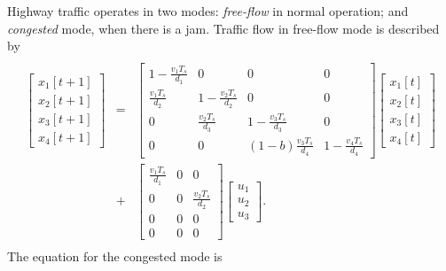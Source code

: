 \documentclass[letterpaper,10pt,english]{sphinxmanual}
\begin{document}
Highway traffic operates in two modes: \emph{free-flow} in normal operation;
and \emph{congested} mode, when there is a jam. Traffic flow in free-flow
mode is described by
\label{chap_examples:equation-fflow}\begin{gather}
\begin{split}\begin{aligned}
\left[\begin{array}{c}
x_1[t+1]\\
x_2[t+1]\\
x_3[t+1]\\
x_4[t+1]\end{array}\right] & = & \left[\begin{array}{cccc}
1-\frac{v_1T_s}{d_1} & 0 & 0 & 0\\
\frac{v_1T_s}{d_2} & 1-\frac{v_2T_s}{d_2} & 0 & 0\\
0 & \frac{v_2T_s}{d_3} & 1-\frac{v_3T_s}{d_3} & 0\\
0 & 0 & (1-b)\frac{v_3T_s}{d_4} & 1-\frac{v_4T_s}{d_4}\end{array}\right]
\left[\begin{array}{c}
x_1[t]\\
x_2[t]\\
x_3[t]\\
x_4[t]\end{array}\right] \nonumber\\
& + & \left[\begin{array}{ccc}
\frac{v_1T_s}{d_1} & 0 & 0\\
0 & 0 & \frac{v_2T_s}{d_2}\\
0 & 0 & 0\\
0 & 0 & 0\end{array}\right]\left[\begin{array}{c}
u_1\\
u_2\\
u_3\end{array}\right].\end{aligned}\end{split}\label{chap_examples-fflow}
\end{gather}
The equation for the congested mode is
\end{document}
